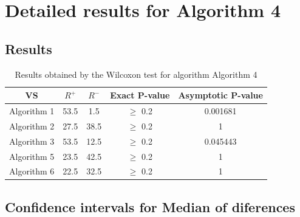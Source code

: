 \documentclass[a4paper,10pt]{article}
\begin{document}
 \clearpage 


\section{Detailed results for Algorithm 4}


\subsection{Results}

\begin{table}[!htp]
\centering\small
\begin{tabular}{
|c|c|c|c|c|}
\hline
 VS & $R^{+}$ & $R^{-}$ & Exact P-value & Asymptotic P-value \\ \hline 
Algorithm 1 & 53.5 & 1.5 & $\geq$ 0.2 & 0.001681\\ \hline 
Algorithm 2 & 27.5 & 38.5 & $\geq$ 0.2 & 1\\ \hline 
Algorithm 3 & 53.5 & 12.5 & $\geq$ 0.2 & 0.045443\\ \hline 
Algorithm 5 & 23.5 & 42.5 & $\geq$ 0.2 & 1\\ \hline 
Algorithm 6 & 22.5 & 32.5 & $\geq$ 0.2 & 1\\ \hline 

\end{tabular}
\caption{Results obtained by the Wilcoxon test for algorithm Algorithm 4}
\end{table}

\subsection{Confidence intervals for Median of diferences}
\end{document}
